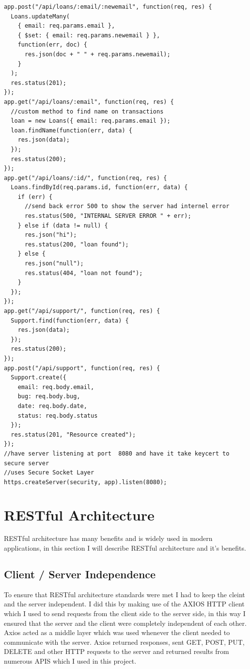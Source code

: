 \begin{verbatim}
app.post("/api/loans/:email/:newemail", function(req, res) {
  Loans.updateMany(
    { email: req.params.email },
    { $set: { email: req.params.newemail } },
    function(err, doc) {
      res.json(doc + " " + req.params.newemail);
    }
  );
  res.status(201);
});
app.get("/api/loans/:email", function(req, res) {
  //custom method to find name on transactions
  loan = new Loans({ email: req.params.email });
  loan.findName(function(err, data) {
    res.json(data);
  });
  res.status(200);
});
app.get("/api/loans/:id/", function(req, res) {
  Loans.findById(req.params.id, function(err, data) {
    if (err) {
      //send back error 500 to show the server had internel error
      res.status(500, "INTERNAL SERVER ERROR " + err);
    } else if (data != null) {
      res.json("hi");
      res.status(200, "loan found");
    } else {
      res.json("null");
      res.status(404, "loan not found");
    }
  });
});
app.get("/api/support/", function(req, res) {
  Support.find(function(err, data) {
    res.json(data);
  });
  res.status(200);
});
app.post("/api/support", function(req, res) {
  Support.create({
    email: req.body.email,
    bug: req.body.bug,
    date: req.body.date,
    status: req.body.status
  });
  res.status(201, "Resource created");
});
//have server listening at port  8080 and have it take keycert to secure server
//uses Secure Socket Layer
https.createServer(security, app).listen(8080);
\end{verbatim}
\section{RESTful Architecture}
RESTful architecture has many benefits and is widely used in modern applications, in this section I will describe RESTful architecture and it's benefits.
\subsection{Client / Server Independence}
To ensure that RESTful architecture standards were met I had to keep the cleint
and the server independent.  I did this by making use of the AXIOS HTTP client which
I used to send requests from the client side to the server side, in this way I ensured
that the server and the client were completely independent of each other.  Axios acted
as a middle layer which was used whenever the client needed to communicate with the server.
Axios returned responses, sent GET, POST, PUT, DELETE and other HTTP requests to the server
and returned results from numerous APIS which I used in this project.
